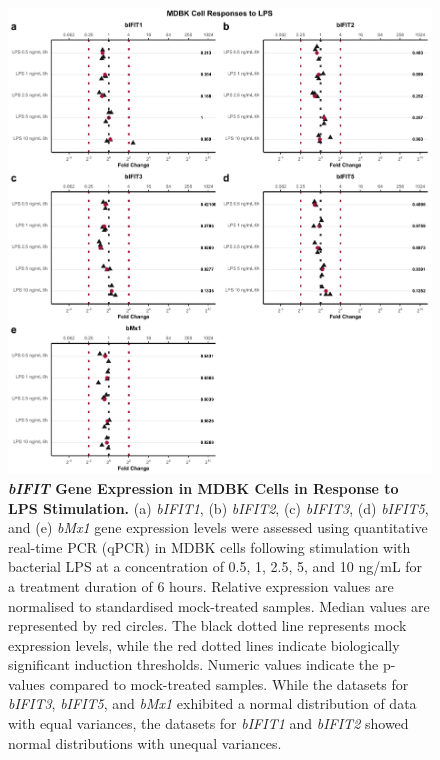 \begin{figure}
    \centering
    \includegraphics[width=1\linewidth]{07. Chapter 2/Figs/02. Induction/02. mdbk_treat_lps.pdf}
    \caption[\textit{bIFIT} Gene Expression in MDBK Cells in Response to LPS Stimulation.]{\textbf{\textit{bIFIT} Gene Expression in MDBK Cells in Response to LPS Stimulation.} (a) \textit{bIFIT1}, (b) \textit{bIFIT2}, (c) \textit{bIFIT3}, (d) \textit{bIFIT5}, and (e) \textit{bMx1} gene expression levels were assessed using quantitative real-time PCR (qPCR) in MDBK cells following stimulation with bacterial LPS at a concentration of 0.5, 1, 2.5, 5, and 10 ng/mL for a treatment duration of 6 hours. Relative expression values are normalised to standardised mock-treated samples. Median values are represented by red circles. The black dotted line represents mock expression levels, while the red dotted lines indicate biologically significant induction thresholds. Numeric values indicate the p-values compared to mock-treated samples. While the datasets for \textit{bIFIT3}, \textit{bIFIT5}, and \textit{bMx1} exhibited a normal distribution of data with equal variances, the datasets for \textit{bIFIT1} and \textit{bIFIT2} showed normal distributions with unequal variances.}
    \label{fig:MDBK responses to LPS}
\end{figure}

